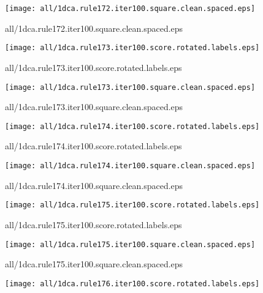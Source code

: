 \documentclass{article}
\begin{document}
\begin{center}
\begin{minipage}{\textwidth}
\texttt{[image: all/1dca.rule172.iter100.square.clean.spaced.eps]}
\end{minipage}
\end{center}
{\footnotesize all/1dca.rule172.iter100.square.clean.spaced.eps}
\begin{center}
\begin{minipage}{\textwidth}
\texttt{[image: all/1dca.rule173.iter100.score.rotated.labels.eps]}
\end{minipage}
\end{center}
{\footnotesize all/1dca.rule173.iter100.score.rotated.labels.eps}
\begin{center}
\begin{minipage}{\textwidth}
\texttt{[image: all/1dca.rule173.iter100.square.clean.spaced.eps]}
\end{minipage}
\end{center}
{\footnotesize all/1dca.rule173.iter100.square.clean.spaced.eps}
\begin{center}
\begin{minipage}{\textwidth}
\texttt{[image: all/1dca.rule174.iter100.score.rotated.labels.eps]}
\end{minipage}
\end{center}
{\footnotesize all/1dca.rule174.iter100.score.rotated.labels.eps}
\begin{center}
\begin{minipage}{\textwidth}
\texttt{[image: all/1dca.rule174.iter100.square.clean.spaced.eps]}
\end{minipage}
\end{center}
{\footnotesize all/1dca.rule174.iter100.square.clean.spaced.eps}
\begin{center}
\begin{minipage}{\textwidth}
\texttt{[image: all/1dca.rule175.iter100.score.rotated.labels.eps]}
\end{minipage}
\end{center}
{\footnotesize all/1dca.rule175.iter100.score.rotated.labels.eps}
\begin{center}
\begin{minipage}{\textwidth}
\texttt{[image: all/1dca.rule175.iter100.square.clean.spaced.eps]}
\end{minipage}
\end{center}
{\footnotesize all/1dca.rule175.iter100.square.clean.spaced.eps}
\begin{center}
\begin{minipage}{\textwidth}
\texttt{[image: all/1dca.rule176.iter100.score.rotated.labels.eps]}
\end{minipage}
\end{center}
\end{document}
